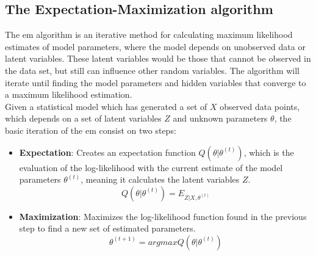 \documentclass[main.tex]{subfiles}
\begin{document}
\subsection{The Expectation-Maximization algorithm}

The \gls{em} algorithm \cite{1977EM} is an iterative method for calculating maximum likelihood estimates of model parameters, where the model depends on unobserved data or latent variables. These latent variables would be those that cannot be observed in the data set, but still can influence other random variables. The algorithm will iterate until finding the model parameters and hidden variables that converge to a maximum likelihood estimation.\\
Given a statistical model which has generated a set of $X$ observed data points, which depends on a set of latent variables $Z$ and unknown parameters $\theta$, the basic iteration of the \gls{em} consist on two steps:

\begin{itemize}
\item \textbf{Expectation}: Creates an expectation function $Q(\theta | \theta^{(t)})$, which is the evaluation of the log-likelihood with the current estimate of the model parameters $\theta^{(t)}$, meaning it calculates the latent variables $Z$.
  \begin{equation}
    Q(\theta | \theta^{(t)}) = E_{Z|X,\theta^(t)}
  \end{equation}
   
\item \textbf{Maximization}: Maximizes the log-likelihood function found in the previous step to find a new set of estimated parameters.
  \begin{equation}
    \theta^{(t+1)} = arg max Q(\theta | \theta^{(t)})
  \end{equation}  
\end{itemize}
\end{document}
